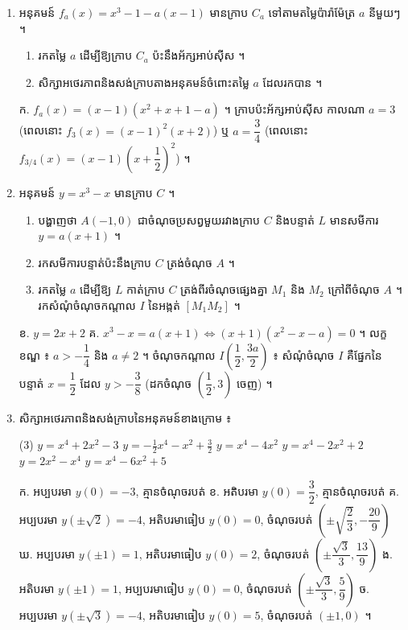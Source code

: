\begin{enumerate}[1]
\begin{enumerate}[a]
  \end{enumerate}
  \ans
  ក. $a = 1$, $b = -6$, $c = 9$, $d = 0$ \quad ខ. អតិបរមាធៀប $f(1) = 4$, អប្បបរមាធៀប $f(3) = 0$, ចំណុចរបត់ $(2, 2)$ ។
  \item អនុគមន៍ $f_a(x) = x^3 - 1 - a(x - 1)$ មានក្រាប $C_a$ ទៅតាមតម្លៃប៉ារ៉ាម៉ែត្រ $a$ នីមួយៗ ។
  \begin{enumerate}[a]
    \item រកតម្លៃ $a$ ដើម្បីឱ្យក្រាប $C_a$ ប៉ះនឹងអ័ក្សអាប់ស៊ីស ។
    \item សិក្សាអថេរភាពនិងសង់ក្រាបតាងអនុគមន៍ចំពោះតម្លៃ $a$ ដែលរកបាន ។
  \end{enumerate}
  \ans
  ក. $f_a(x) = (x - 1)(x^2 + x + 1 - a)$ ។ ក្រាបប៉ះអ័ក្សអាប់ស៊ីស កាលណា $a = 3$ (ពេលនោះ $f_3(x) = (x - 1)^2(x + 2)$) ឬ $a = \dfrac{3}{4}$ (ពេលនោះ $f_{3/4}(x) = (x - 1)\left(x + \dfrac{1}{2}\right)^2$) ។
  \item អនុគមន៍ $y = x^3 - x$ មានក្រាប $C$ ។
  \begin{enumerate}[a]
    \item បង្ហាញថា $A(-1, 0)$ ជាចំណុចប្រសព្វមួយរវាងក្រាប $C$ និងបន្ទាត់ $L$ មានសមីការ $y = a(x + 1)$ ។
    \item រកសមីការបន្ទាត់ប៉ះនឹងក្រាប $C$ ត្រង់ចំណុច $A$ ។
    \item រកតម្លៃ $a$ ដើម្បីឱ្យ $L$ កាត់ក្រាប $C$ ត្រង់ពីរចំណុចផ្សេងគ្នា $M_1$ និង $M_2$ ក្រៅពីចំណុច $A$ ។ រកសំណុំចំណុចកណ្ដាល $I$ នៃអង្កត់ $[M_1M_2]$ ។
  \end{enumerate}
  \ans
  ខ. $y = 2x + 2$ \quad គ. $x^3 - x = a(x + 1) \Leftrightarrow (x + 1)(x^2 - x - a) = 0$ ។ លក្ខខណ្ឌ ៖ $a > -\dfrac{1}{4}$ និង $a \ne 2$ ។ ចំណុចកណ្ដាល $I\left(\dfrac{1}{2}, \dfrac{3a}{2}\right)$ ៖ សំណុំចំណុច $I$ គឺផ្នែកនៃបន្ទាត់ $x = \dfrac{1}{2}$ ដែល $y > -\dfrac{3}{8}$ (ដកចំណុច $\left(\dfrac{1}{2}, 3\right)$ ចេញ) ។
  \item សិក្សាអថេរភាពនិងសង់ក្រាបនៃអនុគមន៍ខាងក្រោម ៖
  \begin{tasks}(3)
    \task $y = x^4 + 2x^2 - 3$
    \task $y = -\frac{1}{2}x^4 - x^2 + \frac{3}{2}$
    \task $y = x^4 - 4x^2$
    \task $y = x^4 - 2x^2 + 2$
    \task $y = 2x^2 - x^4$
    \task $y = x^4 - 6x^2 + 5$
  \end{tasks}
  \ans
  ក. អប្បបរមា $y(0) = -3$, គ្មានចំណុចរបត់ \quad ខ. អតិបរមា $y(0) = \dfrac{3}{2}$, គ្មានចំណុចរបត់ \quad គ. អប្បបរមា $y(\pm\sqrt{2}) = -4$, អតិបរមាធៀប $y(0) = 0$, ចំណុចរបត់ $\left(\pm\sqrt{\dfrac{2}{3}}, -\dfrac{20}{9}\right)$ \quad ឃ. អប្បបរមា $y(\pm 1) = 1$, អតិបរមាធៀប $y(0) = 2$, ចំណុចរបត់ $\left(\pm\dfrac{\sqrt{3}}{3}, \dfrac{13}{9}\right)$ \quad ង. អតិបរមា $y(\pm 1) = 1$, អប្បបរមាធៀប $y(0) = 0$, ចំណុចរបត់ $\left(\pm\dfrac{\sqrt{3}}{3}, \dfrac{5}{9}\right)$ \quad ច. អប្បបរមា $y(\pm\sqrt{3}) = -4$, អតិបរមាធៀប $y(0) = 5$, ចំណុចរបត់ $(\pm 1, 0)$ ។

\end{enumerate}

